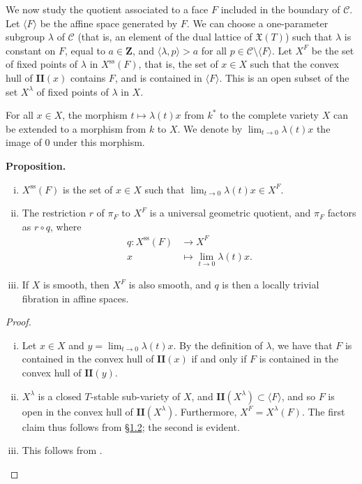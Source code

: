 \documentclass{article}
\newenvironment{itenv}[1]
  {\phantomsection\par\medskip\noindent\textbf{#1.}\itshape}
  {\medskip}
\newcommand{\ZZ}{\mathbf{Z}}
\renewcommand{\ss}{\mathrm{ss}}
\newcommand{\II}{\mathbf{II}}
\newcommand{\oldpage}[1]{\marginpar{\footnotesize$\Big\vert$ \textit{p.~#1}}}
\begin{document}
We now study the quotient associated to a face $F$ included in the boundary of $\mathcal{C}$.
Let $\langle F\rangle$ be the affine space generated by $F$.
We can choose a one-parameter subgroup $\lambda$ of $\mathcal{C}$ (that is, an element of the dual lattice of $\mathfrak{X}(T)$) such that $\lambda$ is constant on $F$, equal to $a\in\ZZ$, and $\langle\lambda,p\rangle>a$ for all $p\in\mathcal{C}\setminus\langle F\rangle$.
Let $X^F$ be the set of fixed points of $\lambda$ in $X^\ss(F)$, that is, the set of $x\in X$ such that the convex hull of $\II(x)$ contains $F$, and is contained in $\langle F\rangle$.
This is an open subset of the set $X^\lambda$ of fixed points of $\lambda$ in $X$.

For all $x\in X$, the morphism $t\mapsto\lambda(t)x$ from $k^*$ to the complete variety $X$ can be extended to a morphism from $k$ to $X$.
We denote by $\lim_{t\to0}\lambda(t)x$ the image of $0$ under this morphism.

\begin{itenv}{Proposition}
  \begin{enumerate}[(i)]
    \item $X^\ss(F)$ is the set of $x\in X$ such that $\lim_{t\to0}\lambda(t)x\in X^F$.
    \item The restriction $r$ of $\pi_F$ to $X^F$ is a universal geometric quotient, and $\pi_F$ factors as $r\circ q$, where
      \[
        \begin{aligned}
          q\colon X^\ss(F) &\to X^F
        \\x &\mapsto \lim_{t\to0}\lambda(t)x.
        \end{aligned}
      \]
    \item If $X$ is smooth, then $X^F$ is also smooth, and $q$ is then a locally trivial fibration in affine spaces.
  \end{enumerate}
\end{itenv}

\begin{proof}
  \begin{enumerate}[(i)]
    \item Let $x\in X$ and $y=\lim_{t\to0}\lambda(t)x$.
      By the definition of $\lambda$, we have that
\oldpage{516}
      $F$ is contained in the convex hull of $\II(x)$ if and only if $F$ is contained in the convex hull of $\II(y)$.
    \item $X^\lambda$ is a closed $T$-stable sub-variety of $X$, and $\II(X^\lambda)\subset\langle F\rangle$, and so $F$ is open in the convex hull of $\II(X^\lambda)$.
      Furthermore, $X^F=X^\lambda(F)$.
      The first claim thus follows from \hyperref[1.2]{\S1.2};
      the second is evident.
    \item This follows from \cite[Theorem~4.4.]{BB}.
  \end{enumerate}
\end{proof}
\end{document}
